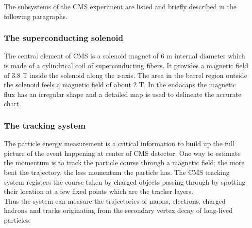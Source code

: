 The subsystems of the CMS experiment are listed and briefly described
in the following paragraphs.

\subsubsection{The superconducting solenoid}
The central element of CMS is a solenoid magnet of 6 m internal diameter
which is made of a cylindrical coil of superconducting fibers. It 
provides a magnetic field of 3.8 T inside the solenoid along the
\emph{z}-axis. The area in the barrel region outside the solenoid
feels a magnetic field of about 2 T.
In the endacaps the
magnetic flux has an irregular shape and a detailed map is used to
delineate the accurate chart.
\subsubsection{The tracking system}\label{sec:tracking}
The particle energy measurement is a critical information to build up the full
picture of the event happening at center of CMS detector. One way to
estimate the momentum is to track the particle course through a
magnetic field; the more bent the trajectory, the less momentum the
particle has. The CMS tracking system registers the course taken by
charged objects passing through by spotting their location at a few
fixed points which are the tracker layers. \\
Thus the system can measure the trajectories of muons, electrons,
charged hadrons and tracks originating from the secondary vertex decay of long-lived
particles.

